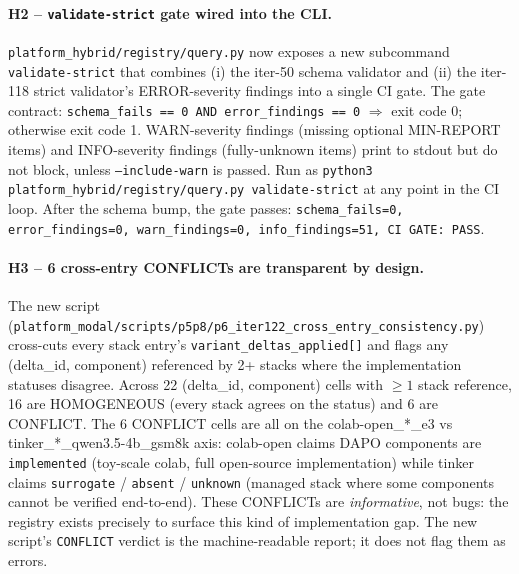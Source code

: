 \documentclass{article}
\begin{document}
\paragraph{H2 -- \texttt{validate-strict} gate wired into the CLI.}
\texttt{platform_hybrid/registry/query.py} now exposes a new subcommand
\texttt{validate-strict} that combines (i) the iter-50 schema validator
and (ii) the iter-118 strict validator's ERROR-severity findings into a
single CI gate. The gate contract: \texttt{schema\_fails == 0 AND
error\_findings == 0} $\Rightarrow$ exit code 0; otherwise exit code 1.
WARN-severity findings (missing optional MIN-REPORT items) and
INFO-severity findings (fully-unknown items) print to stdout but do not
block, unless \texttt{--include-warn} is passed. Run as
\texttt{python3 platform_hybrid/registry/query.py validate-strict} at any point in the
CI loop. After the schema bump, the gate passes:
\texttt{schema\_fails=0, error\_findings=0, warn\_findings=0,
info\_findings=51, CI GATE: PASS}.

\paragraph{H3 -- 6 cross-entry CONFLICTs are transparent by design.}
The new script
(\texttt{platform_modal/scripts/p5p8/p6\_iter122\_cross\_entry\_consistency.py})
cross-cuts every stack entry's \texttt{variant\_deltas\_applied[]} and
flags any (delta\_id, component) referenced by 2+ stacks where the
implementation statuses disagree. Across 22 (delta\_id, component)
cells with $\geq 1$ stack reference, 16 are HOMOGENEOUS (every stack
agrees on the status) and 6 are CONFLICT. The 6 CONFLICT cells are all
on the colab-open\_*\_e3 vs tinker\_*\_qwen3.5-4b\_gsm8k axis: colab-open
claims DAPO components are \texttt{implemented} (toy-scale colab, full
open-source implementation) while tinker claims
\texttt{surrogate} / \texttt{absent} / \texttt{unknown} (managed stack
where some components cannot be verified end-to-end). These CONFLICTs
are \emph{informative}, not bugs: the registry exists precisely to
surface this kind of implementation gap. The new script's
\texttt{CONFLICT} verdict is the machine-readable report; it does not
flag them as errors.
\end{document}
